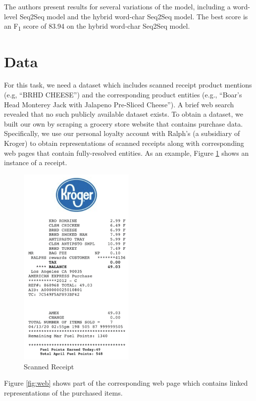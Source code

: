 \documentclass[11pt,a4paper]{article}
\begin{document}
The authors present results for several variations of the model,
including a word-level Seq2Seq model and the hybrid word-char Seq2Seq
model.  The best score is an F\textsubscript{1} score of 83.94 on the
hybrid word-char Seq2Seq model.

\section{Data}

For this task, we need a dataset which includes scanned receipt
product mentions (e.g, ``BRHD CHEESE'') and the corresponding product
entities (e.g.,  ``Boar's Head Monterey Jack with Jalapeno Pre-Sliced
Cheese'').  A brief web search revealed that no such publicly available
dataset exists.  To obtain a dataset, we built our own by scraping a
grocery store website that contains purchase data.  Specifically, we
use our personal loyalty account with Ralph's (a subsidiary of
Kroger) to obtain representations of scanned receipts along with
corresponding web pages that contain fully-resolved entities.   
As an example, Figure \ref{fig:scanned} shows an instance of a receipt. 


\begin{figure}[h]
  \centering
    \includegraphics[width=0.5\textwidth]{raw_receipt}
    \caption{Scanned Receipt}
    \label{fig:scanned}
\end{figure}

Figure \ref{fig:web} shows part of the corresponding web page which contains linked representations of the purchased items.
\end{document}

